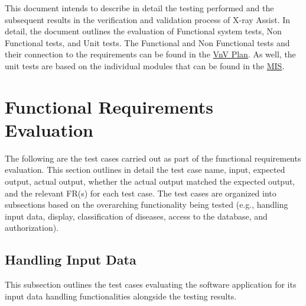 \documentclass[12pt, titlepage]{article}
\begin{document}
\newpage

This document intends to describe in detail the testing performed and the subsequent results in the verification and validation process of X-ray Assist. In detail, the document outlines the evaluation of Functional system tests, Non Functional tests, and Unit tests. The Functional and Non Functional tests and their connection to the requirements can be found in the \href{https://github.com/tusharagg1/chest-x-ray-ai/blob/main/docs/VnVPlan/VnVPlan.pdf}{VnV Plan}. As well, the unit tests are based on the individual modules that can be found in the \href{https://github.com/tusharagg1/chest-x-ray-ai/blob/main/docs/Design/SoftDetailedDes/MIS.pdf}{MIS}.  

\section{Functional Requirements Evaluation}
The following are the test cases carried out as part of the functional requirements evaluation. This section outlines in detail the test case name, input, expected output, actual output, whether the actual output matched the expected output, and the relevant FR(s) for each test case. The test cases are organized into subsections based on the overarching functionality being tested (e.g., handling input data, display, classification of diseases, access to the database, and authorization).

\subsection{Handling Input Data}
This subsection outlines the test cases evaluating the software application for its input data handling functionalities alongside the testing results. \\

\end{document}
